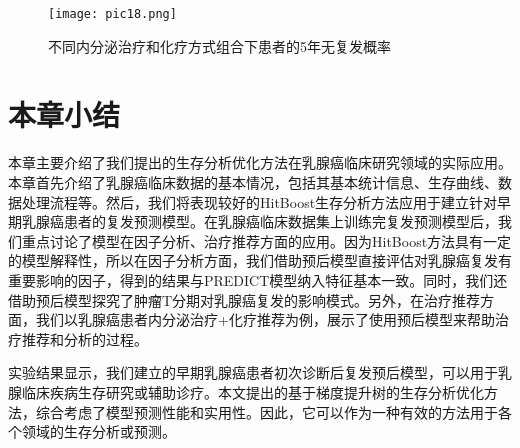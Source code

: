 \begin{figure}[H]
\texttt{[image: pic18.png]}
\caption{不同内分泌治疗和化疗方式组合下患者的5年无复发概率}
\label{pic18}
\end{figure}

\section{本章小结}

本章主要介绍了我们提出的生存分析优化方法在乳腺癌临床研究领域的实际应用。本章首先介绍了乳腺癌临床数据的基本情况，包括其基本统计信息、生存曲线、数据处理流程等。然后，我们将表现较好的HitBoost生存分析方法应用于建立针对早期乳腺癌患者的复发预测模型。在乳腺癌临床数据集上训练完复发预测模型后，我们重点讨论了模型在因子分析、治疗推荐方面的应用。因为HitBoost方法具有一定的模型解释性，所以在因子分析方面，我们借助预后模型直接评估对乳腺癌复发有重要影响的因子，得到的结果与PREDICT模型纳入特征基本一致。同时，我们还借助预后模型探究了肿瘤T分期对乳腺癌复发的影响模式。另外，在治疗推荐方面，我们以乳腺癌患者内分泌治疗+化疗推荐为例，展示了使用预后模型来帮助治疗推荐和分析的过程。

实验结果显示，我们建立的早期乳腺癌患者初次诊断后复发预后模型，可以用于乳腺临床疾病生存研究或辅助诊疗。本文提出的基于梯度提升树的生存分析优化方法，综合考虑了模型预测性能和实用性。因此，它可以作为一种有效的方法用于各个领域的生存分析或预测。

